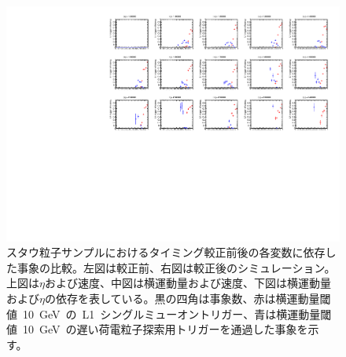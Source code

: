 \begin{figure}[tbp]
\begin{minipage}{0.49\hsize}
    \subcaption{}
    \end{minipage}
    \begin{minipage}{0.49\hsize}
    \centering   
    \includegraphics[width=\textwidth,page=14]{img/rec/stau_600.pdf}
    \subcaption{}
    \end{minipage}
    \caption[スタウ粒子サンプルにおけるタイミング較正前後の各変数に依存した事象の比較]{スタウ粒子サンプルにおけるタイミング較正前後の各変数に依存した事象の比較。左図は較正前、右図は較正後のシミュレーション。上図は$\eta$および速度、中図は横運動量および速度、下図は横運動量および$\eta$の依存を表している。黒の四角は事象数、赤は横運動量閾値~10~GeV~の~L1~シングルミューオントリガー、青は横運動量閾値~10~GeV~の遅い荷電粒子探索用トリガーを通過した事象を示す。}\label{fig:tripteta}
\end{figure}

